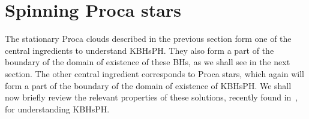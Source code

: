  

\section{Spinning Proca stars} 
\label{sec_stars}
The stationary Proca clouds described in the previous section form one of the central ingredients to understand KBHsPH. They also form a part of the boundary of the domain of existence of these BHs, as we shall see in the next section. The other central ingredient corresponds to Proca stars, which again will form a part of the boundary of the domain of existence of KBHsPH. We shall now briefly review the relevant properties of these solutions, recently found in~\cite{Brito:2015pxa}, for understanding KBHsPH.

